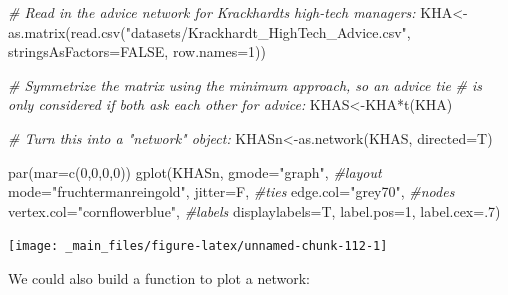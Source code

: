 \documentclass[
  notitlepage,
  onecolumn,
  openany]{book}
\newenvironment{Shaded}{\begin{snugshade}}{\end{snugshade}}
\newcommand{\AttributeTok}[1]{\textcolor[rgb]{0.77,0.63,0.00}{#1}}
\newcommand{\CommentTok}[1]{\textcolor[rgb]{0.56,0.35,0.01}{\textit{#1}}}
\newcommand{\ConstantTok}[1]{\textcolor[rgb]{0.00,0.00,0.00}{#1}}
\newcommand{\DecValTok}[1]{\textcolor[rgb]{0.00,0.00,0.81}{#1}}
\newcommand{\FunctionTok}[1]{\textcolor[rgb]{0.00,0.00,0.00}{#1}}
\newcommand{\NormalTok}[1]{#1}
\newcommand{\OtherTok}[1]{\textcolor[rgb]{0.56,0.35,0.01}{#1}}
\newcommand{\SpecialCharTok}[1]{\textcolor[rgb]{0.00,0.00,0.00}{#1}}
\newcommand{\StringTok}[1]{\textcolor[rgb]{0.31,0.60,0.02}{#1}}
\begin{document}
\begin{Shaded}
\begin{Highlighting}[]
\CommentTok{\# Read in the advice network for Krackhardt\textquotesingle{}s high{-}tech managers:}
\NormalTok{KHA}\OtherTok{\textless{}{-}}\FunctionTok{as.matrix}\NormalTok{(}\FunctionTok{read.csv}\NormalTok{(}\StringTok{"datasets/Krackhardt\_HighTech\_Advice.csv"}\NormalTok{,}
                        \AttributeTok{stringsAsFactors=}\ConstantTok{FALSE}\NormalTok{, }\AttributeTok{row.names=}\DecValTok{1}\NormalTok{))}

\CommentTok{\# Symmetrize the matrix using the minimum approach, so an advice tie}
\CommentTok{\# is only considered if both ask each other for advice:}
\NormalTok{KHAS}\OtherTok{\textless{}{-}}\NormalTok{KHA}\SpecialCharTok{*}\FunctionTok{t}\NormalTok{(KHA)}

\CommentTok{\# Turn this into a "network" object:}
\NormalTok{KHASn}\OtherTok{\textless{}{-}}\FunctionTok{as.network}\NormalTok{(KHAS, }\AttributeTok{directed=}\NormalTok{T)}

\FunctionTok{par}\NormalTok{(}\AttributeTok{mar=}\FunctionTok{c}\NormalTok{(}\DecValTok{0}\NormalTok{,}\DecValTok{0}\NormalTok{,}\DecValTok{0}\NormalTok{,}\DecValTok{0}\NormalTok{))}
\FunctionTok{gplot}\NormalTok{(KHASn, }
      \AttributeTok{gmode=}\StringTok{"graph"}\NormalTok{,}
      \CommentTok{\#layout}
      \AttributeTok{mode=}\StringTok{"fruchtermanreingold"}\NormalTok{,}
      \AttributeTok{jitter=}\NormalTok{F,}
      \CommentTok{\#ties}
      \AttributeTok{edge.col=}\StringTok{"grey70"}\NormalTok{,}
      \CommentTok{\#nodes}
      \AttributeTok{vertex.col=}\StringTok{"cornflowerblue"}\NormalTok{,}
      \CommentTok{\#labels}
      \AttributeTok{displaylabels=}\NormalTok{T,}
      \AttributeTok{label.pos=}\DecValTok{1}\NormalTok{,}
      \AttributeTok{label.cex=}\NormalTok{.}\DecValTok{7}\NormalTok{)}
\end{Highlighting}
\end{Shaded}

\begin{center}\texttt{[image: \_main\_files/figure-latex/unnamed-chunk-112-1]} \end{center}

We could also build a function to plot a network:
\end{document}
